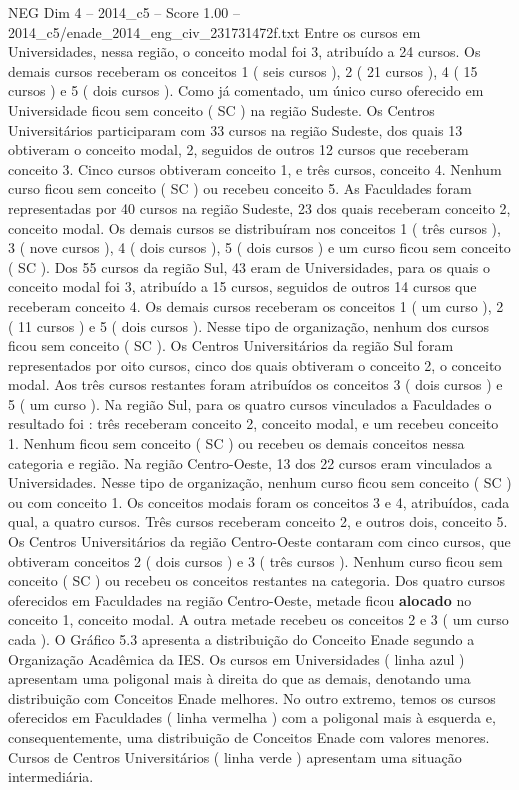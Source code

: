 \begin{textsample}{NEG Dim 4 – 2014\_c5 – Score 1.00 – 2014\_c5/enade\_2014\_eng\_civ\_231731472f.txt}
Entre os cursos em Universidades, nessa região, o conceito modal foi 3, atribuído a 24 cursos.
Os demais cursos receberam os conceitos 1 ( seis cursos ), 2 ( 21 cursos ), 4 ( 15 cursos ) e 5 ( dois cursos ).
Como já comentado, um único curso oferecido em Universidade ficou sem conceito ( SC ) na região Sudeste.
Os Centros Universitários participaram com 33 cursos na região Sudeste, dos quais 13 obtiveram o conceito modal, 2, seguidos de outros 12 cursos que receberam conceito 3.
Cinco cursos obtiveram conceito 1, e três cursos, conceito 4.
Nenhum curso ficou sem conceito ( SC ) ou recebeu conceito 5.
As Faculdades foram representadas por 40 cursos na região Sudeste, 23 dos quais receberam conceito 2, conceito modal.
Os demais cursos se distribuíram nos conceitos 1 ( três cursos ), 3 ( nove cursos ), 4 ( dois cursos ), 5 ( dois cursos ) e um curso ficou sem conceito ( SC ).
Dos 55 cursos da região Sul, 43 eram de Universidades, para os quais o conceito modal foi 3, atribuído a 15 cursos, seguidos de outros 14 cursos que receberam conceito 4.
Os demais cursos receberam os conceitos 1 ( um curso ), 2 ( 11 cursos ) e 5 ( dois cursos ).
Nesse tipo de organização, nenhum dos cursos ficou sem conceito ( SC ).
Os Centros Universitários da região Sul foram representados por oito cursos, cinco dos quais obtiveram o conceito 2, o conceito modal.
Aos três cursos restantes foram atribuídos os conceitos 3 ( dois cursos ) e 5 ( um curso ).
Na região Sul, para os quatro cursos vinculados a Faculdades o resultado foi : três receberam conceito 2, conceito modal, e um recebeu conceito 1.
Nenhum ficou sem conceito ( SC ) ou recebeu os demais conceitos nessa categoria e região.
Na região Centro-Oeste, 13 dos 22 cursos eram vinculados a Universidades.
Nesse tipo de organização, nenhum curso ficou sem conceito ( SC ) ou com conceito 1.
Os conceitos modais foram os conceitos 3 e 4, atribuídos, cada qual, a quatro cursos.
Três cursos receberam conceito 2, e outros dois, conceito 5.
Os Centros Universitários da região Centro-Oeste contaram com cinco cursos, que obtiveram conceitos 2 ( dois cursos ) e 3 ( três cursos ).
Nenhum curso ficou sem conceito ( SC ) ou recebeu os conceitos restantes na categoria.
Dos quatro cursos oferecidos em Faculdades na região Centro-Oeste, metade ficou \textbf{alocado} no conceito 1, conceito modal.
A outra metade recebeu os conceitos 2 e 3 ( um curso cada ).
O Gráfico 5.3 apresenta a distribuição do Conceito Enade segundo a Organização Acadêmica da IES.
Os cursos em Universidades ( linha azul ) apresentam uma poligonal mais à direita do que as demais, denotando uma distribuição com Conceitos Enade melhores.
No outro extremo, temos os cursos oferecidos em Faculdades ( linha vermelha ) com a poligonal mais à esquerda e, consequentemente, uma distribuição de Conceitos Enade com valores menores.
Cursos de Centros Universitários ( linha verde ) apresentam uma situação intermediária.

\end{textsample}
